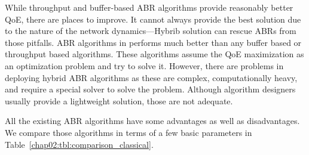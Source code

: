 While throughput and buffer-based ABR algorithms provide reasonably better QoE, there are places to improve. It cannot always provide the best solution due to the nature of the network dynamics—Hybrib solution can rescue ABRs from those pitfalls. ABR algorithms in \cite{7247436,140405,yin2015control,10.1145/2670518.2673877} performs much better than any buffer based or throughput based algorithms. These algorithms assume the QoE maximization as an optimization problem and try to solve it. However, there are problems in deploying hybrid ABR algorithms as these are complex, computationally heavy, and require a special solver to solve the problem. Although algorithm designers usually provide a lightweight solution, those are not adequate.

All the existing ABR algorithms have some advantages as well as disadvantages. We compare those algorithms in terms of a few basic parameters in Table~\ref{chap02:tbl:comparison_classical}.

